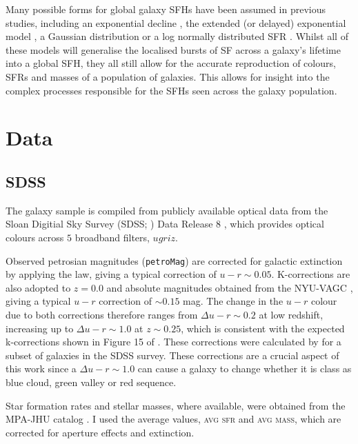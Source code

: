Many possible forms for global galaxy SFHs have been assumed in previous studies, including an exponential decline \citep{tinsley72, gavazzi02, weiner06, Martin07, noeske07, schawinski07}, the extended (or delayed) exponential model \citep{gavazzi02, oemler13, simha14}, a Gaussian distribution \citep{feuillet16} or a log normally distributed SFR \citep{gladders13, abramson16}. Whilst all of these models will generalise the localised bursts of SF across a galaxy's lifetime into a global SFH, they all still allow for the accurate reproduction of colours, SFRs and masses of a population of galaxies. This allows for insight into the complex processes responsible for the SFHs seen across the galaxy population. 

\section{Data}\label{sec:data}

\subsection{SDSS}\label{sec:sdssintro}

The galaxy sample is compiled from publicly available optical data from the Sloan Digitial Sky Survey (SDSS; \citealt{York00}) Data Release 8 \citep{Aihara11}, which provides optical colours across $5$ broadband filters, $ugriz$. 

Observed petrosian magnitudes ({\tt petroMag}) are corrected for galactic extinction \citep{Oh11} by applying the \citet*{Cardelli89} law, giving a typical correction of $u-r \sim 0.05$. K-corrections are also adopted to $z=0.0$ and absolute magnitudes obtained from the NYU-VAGC \citep{Blanton05, padmanabhan08, blanton07}, giving a typical $u-r$ correction of $\sim 0.15$ mag. The change in the $u-r$ colour due to both corrections therefore ranges from $\Delta u-r \sim 0.2$ at low redshift, increasing up to $\Delta u-r \sim 1.0$ at $z \sim 0.25$, which is consistent with the expected k-corrections shown in Figure 15 of \citet{blanton07}. These corrections were calculated by \citet{Bamford09} for a subset of galaxies in the SDSS survey. These corrections are a crucial aspect of this work since a $\Delta u-r \sim 1.0$ can cause a galaxy to change whether it is class as blue cloud, green valley or red sequence.

Star formation rates and stellar masses, where available, were obtained from the MPA-JHU catalog \citep{kauffmann03, brinchmann04}. I used the average values, \textsc{avg sfr} and \textsc{avg mass}, which are corrected for aperture effects and extinction.

